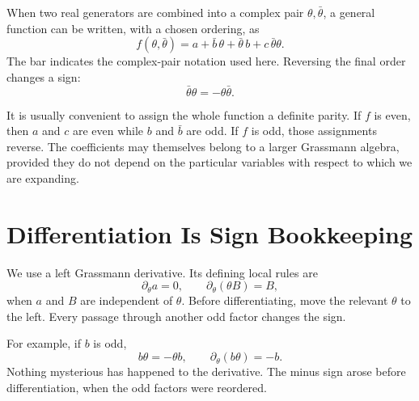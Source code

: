 When two real generators are combined into a complex pair \(\theta,\bar\theta\), a general function can be written, with a chosen ordering, as
\begin{equation}
f(\theta,\bar\theta)
=a+\bar b\,\theta+\bar\theta\,b+c\,\bar\theta\theta.
\end{equation}
The bar indicates the complex-pair notation used here. Reversing the final order changes a sign:
\begin{equation}
\bar\theta\theta=-\theta\bar\theta.
\end{equation}

It is usually convenient to assign the whole function a definite parity. If \(f\) is even, then \(a\) and \(c\) are even while \(b\) and \(\bar b\) are odd. If \(f\) is odd, those assignments reverse. The coefficients may themselves belong to a larger Grassmann algebra, provided they do not depend on the particular variables with respect to which we are expanding.

\begin{classroomqa}
\end{classroomqa}

\section{Differentiation Is Sign Bookkeeping}

We use a left Grassmann derivative. Its defining local rules are
\begin{equation}
\partial_\theta a=0,
\qquad
\partial_\theta(\theta B)=B,
\end{equation}
when \(a\) and \(B\) are independent of \(\theta\). Before differentiating, move the relevant \(\theta\) to the left. Every passage through another odd factor changes the sign.

For example, if \(b\) is odd,
\begin{equation}
b\theta=-\theta b,
\qquad
\partial_\theta(b\theta)=-b.
\end{equation}
Nothing mysterious has happened to the derivative. The minus sign arose before differentiation, when the odd factors were reordered.

